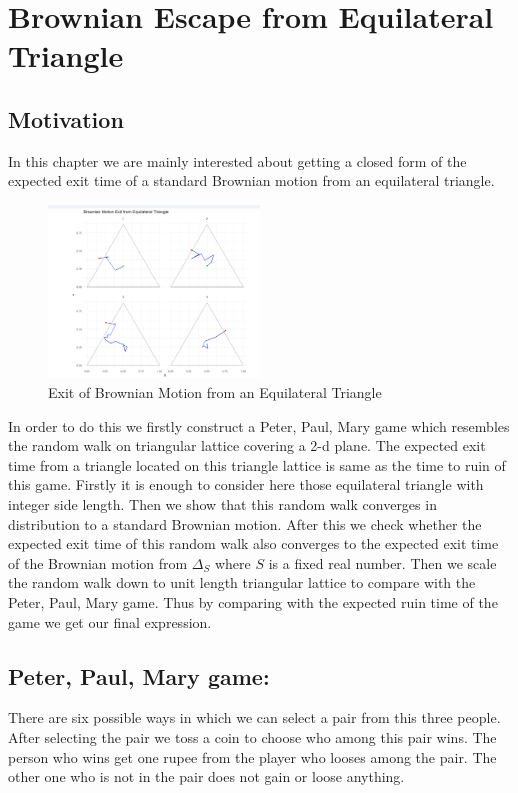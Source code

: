 \documentclass[11pt, a4paper, oneside]{report}
\numberwithin{equation}{section}
\begin{document}
\chapter{Brownian Escape from Equilateral Triangle}\label{sec4}

\section{Motivation} In this chapter we are mainly interested about getting a closed form of the expected exit time of a standard Brownian motion from an equilateral triangle.
\begin{figure}[htbp]
    \centering
    \includegraphics[width=0.5\textwidth]{Screenshot 2025-07-05 141656.png}
    \caption{Exit of Brownian Motion from an Equilateral Triangle}
    \label{fig:Exit_BM_Square}
\end{figure}
In order to do this we firstly construct a Peter, Paul, Mary game which resembles the random walk on triangular lattice covering a 2-d plane. The expected exit time from a triangle located on this triangle lattice is same as the time to ruin of this game. Firstly it is enough to consider here those equilateral triangle with integer side length.
Then we show that this random walk converges in distribution to a standard Brownian motion.
After this we check whether the expected exit time of this random walk also converges to the expected exit time of the Brownian motion from $\Delta_S$ where $S$ is a fixed real number.
Then we scale the random walk down to unit length triangular lattice to compare with the Peter, Paul, Mary game. Thus by comparing with the expected ruin time of the game we get our final expression.


\section{Peter, Paul, Mary game:} There are six possible ways in which we can select a pair from this three people. After selecting the pair we toss a coin to choose who among this pair wins. The person who wins get one rupee from the player who looses among the pair. The other one who is not in the pair does not gain or loose anything.
\end{document}
